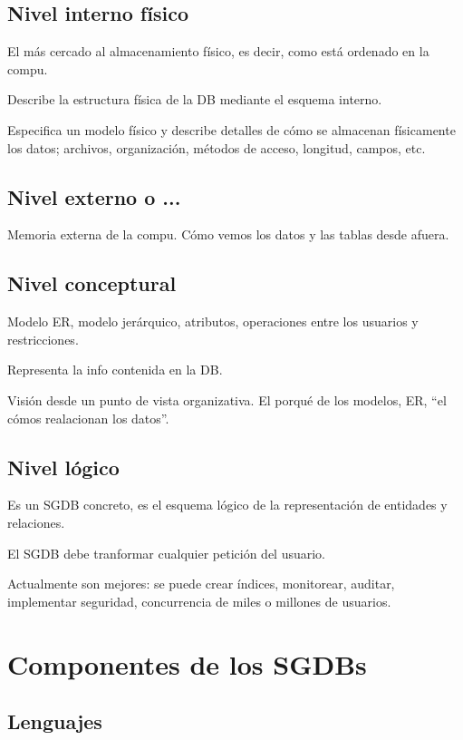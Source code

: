 \documentclass{article}
\begin{document}
\subsection{Nivel interno físico}

El más cercado al almacenamiento físico, es decir, como está ordenado en la compu.

Describe la estructura física de la DB mediante el esquema interno.

Especifica un modelo físico y describe detalles de cómo se almacenan físicamente
los datos; archivos, organización, métodos de acceso, longitud, campos, etc.

\subsection{Nivel externo o ...}
Memoria externa de la compu.
Cómo vemos los datos y las tablas desde afuera.

\subsection{Nivel conceptural}

Modelo ER, modelo jerárquico, atributos, operaciones entre los usuarios y
restricciones.

Representa la info contenida en la DB.

Visión desde un punto de vista organizativa. El porqué de los modelos, ER,
``el cómos realacionan los datos''.

\subsection{Nivel lógico}

Es un SGDB concreto, es el esquema lógico de la representación de entidades y
relaciones.

\vspace{1em}
El SGDB debe tranformar cualquier petición del usuario.

Actualmente son mejores: se puede crear índices, monitorear, auditar, implementar
seguridad, concurrencia de miles o millones de usuarios.

\section{Componentes de los SGDBs}

\subsection{Lenguajes}
\end{document}
